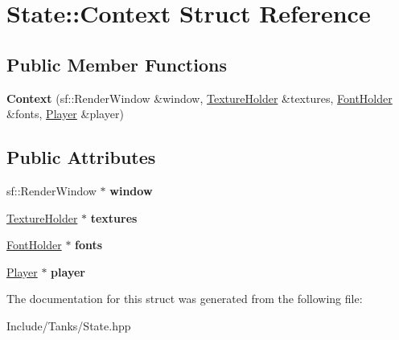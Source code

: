 \hypertarget{struct_state_1_1_context}{}\section{State\+:\+:Context Struct Reference}
\label{struct_state_1_1_context}
\subsection*{Public Member Functions}
\begin{DoxyCompactItemize}
\item 
\hypertarget{struct_state_1_1_context_ac8380f7873b3248c7cf32c604bbdda26}{}{\bfseries Context} (sf\+::\+Render\+Window \&window, \hyperlink{class_resource_holder}{Texture\+Holder} \&textures, \hyperlink{class_resource_holder}{Font\+Holder} \&fonts, \hyperlink{class_player}{Player} \&player)\label{struct_state_1_1_context_ac8380f7873b3248c7cf32c604bbdda26}

\end{DoxyCompactItemize}
\subsection*{Public Attributes}
\begin{DoxyCompactItemize}
\item 
\hypertarget{struct_state_1_1_context_a30775e70e841c761a4e3cb7f0e195128}{}sf\+::\+Render\+Window $\ast$ {\bfseries window}\label{struct_state_1_1_context_a30775e70e841c761a4e3cb7f0e195128}

\item 
\hypertarget{struct_state_1_1_context_a587123ee3b00e8c68c1d99ca6011a53d}{}\hyperlink{class_resource_holder}{Texture\+Holder} $\ast$ {\bfseries textures}\label{struct_state_1_1_context_a587123ee3b00e8c68c1d99ca6011a53d}

\item 
\hypertarget{struct_state_1_1_context_a8b4a94c250018312ccf2e58a33f0c77a}{}\hyperlink{class_resource_holder}{Font\+Holder} $\ast$ {\bfseries fonts}\label{struct_state_1_1_context_a8b4a94c250018312ccf2e58a33f0c77a}

\item 
\hypertarget{struct_state_1_1_context_a1c98434687748acdebf78fd80a4767ad}{}\hyperlink{class_player}{Player} $\ast$ {\bfseries player}\label{struct_state_1_1_context_a1c98434687748acdebf78fd80a4767ad}

\end{DoxyCompactItemize}


The documentation for this struct was generated from the following file\+:\begin{DoxyCompactItemize}
\item 
Include/\+Tanks/State.\+hpp\end{DoxyCompactItemize}
